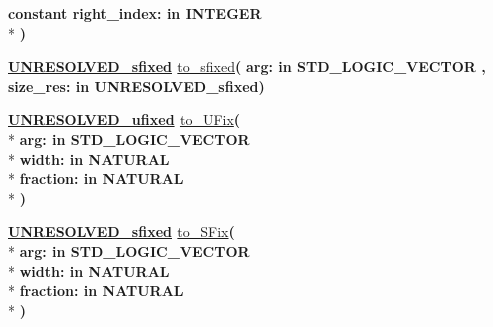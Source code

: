 \begin{DoxyCompactItemize}
{\bfseries {\bfseries \textcolor{keywordflow}{constant}\textcolor{vhdlchar}{ }}\textcolor{vhdlchar}{right\+\_\+index\+: }\textcolor{stringliteral}{in }{\bfseries \textcolor{comment}{I\+N\+T\+E\+G\+E\+R}\textcolor{vhdlchar}{ }}}\\*
{\bfseries  )} 
\item 
{\bfseries {\bfseries {\bfseries \hyperlink{classfixed__pkg_aa723b28a027c3c0f9bca02d75e8df4d6}{U\+N\+R\+E\+S\+O\+L\+V\+E\+D\+\_\+sfixed}} \textcolor{vhdlchar}{ }}} \hyperlink{classfixed__pkg_acef6c4472059ccc60871f4189787d202}{to\+\_\+sfixed}{\bfseries  ( }{\bfseries \textcolor{vhdlchar}{arg\+: }\textcolor{stringliteral}{in }{\bfseries \textcolor{comment}{S\+T\+D\+\_\+\+L\+O\+G\+I\+C\+\_\+\+V\+E\+C\+T\+O\+R}\textcolor{vhdlchar}{ }}}{\bfseries  , \textcolor{vhdlchar}{size\+\_\+res\+: }\textcolor{stringliteral}{in }\textcolor{vhdlchar}{U\+N\+R\+E\+S\+O\+L\+V\+E\+D\+\_\+sfixed}}{\bfseries  )} 
\item 
{\bfseries {\bfseries {\bfseries \hyperlink{classfixed__pkg_ae78bc2b36d22f6abeac163955e8a587d}{U\+N\+R\+E\+S\+O\+L\+V\+E\+D\+\_\+ufixed}} \textcolor{vhdlchar}{ }}} \hyperlink{classfixed__pkg_a8958e5546182abd6114937a60e629a90}{to\+\_\+\+U\+Fix}{\bfseries  ( }\\*
{\bfseries \textcolor{vhdlchar}{arg\+: }\textcolor{stringliteral}{in }{\bfseries \textcolor{comment}{S\+T\+D\+\_\+\+L\+O\+G\+I\+C\+\_\+\+V\+E\+C\+T\+O\+R}\textcolor{vhdlchar}{ }}}\\*
{\bfseries \textcolor{vhdlchar}{width\+: }\textcolor{stringliteral}{in }{\bfseries \textcolor{comment}{N\+A\+T\+U\+R\+A\+L}\textcolor{vhdlchar}{ }}}\\*
{\bfseries \textcolor{vhdlchar}{fraction\+: }\textcolor{stringliteral}{in }{\bfseries \textcolor{comment}{N\+A\+T\+U\+R\+A\+L}\textcolor{vhdlchar}{ }}}\\*
{\bfseries  )} 
\item 
{\bfseries {\bfseries {\bfseries \hyperlink{classfixed__pkg_aa723b28a027c3c0f9bca02d75e8df4d6}{U\+N\+R\+E\+S\+O\+L\+V\+E\+D\+\_\+sfixed}} \textcolor{vhdlchar}{ }}} \hyperlink{classfixed__pkg_a5206ba96e8fde8df1ad0cc58d7ea3a8b}{to\+\_\+\+S\+Fix}{\bfseries  ( }\\*
{\bfseries \textcolor{vhdlchar}{arg\+: }\textcolor{stringliteral}{in }{\bfseries \textcolor{comment}{S\+T\+D\+\_\+\+L\+O\+G\+I\+C\+\_\+\+V\+E\+C\+T\+O\+R}\textcolor{vhdlchar}{ }}}\\*
{\bfseries \textcolor{vhdlchar}{width\+: }\textcolor{stringliteral}{in }{\bfseries \textcolor{comment}{N\+A\+T\+U\+R\+A\+L}\textcolor{vhdlchar}{ }}}\\*
{\bfseries \textcolor{vhdlchar}{fraction\+: }\textcolor{stringliteral}{in }{\bfseries \textcolor{comment}{N\+A\+T\+U\+R\+A\+L}\textcolor{vhdlchar}{ }}}\\*
{\bfseries  )} 
\end{DoxyCompactItemize}
